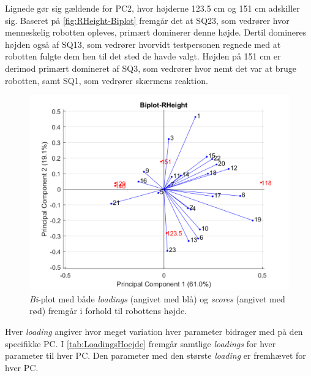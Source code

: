 Lignede gør sig gældende for PC2, hvor højderne 123.5 cm og 151 cm adskiller sig. Baseret på \autoref{fig:RHeight-Biplot} fremgår det at SQ23, som vedrører hvor menneskelig robotten opleves, primært dominerer denne højde. Dertil domineres højden også af SQ13, som vedrører hvorvidt testpersonen regnede med at robotten fulgte dem hen til det sted de havde valgt. Højden på 151 cm er derimod primært domineret af SQ3, som vedrører hvor nemt det var at bruge robotten, samt SQ1, som vedrører skærmens reaktion. 
%
\begin{figure}[H]
\centering
\includegraphics[width=\textwidth]{Figure/DatabehandlingSkalaer/PCAfigures/RHeight-Biplot.png}
\caption{\textit{Bi}-plot med både \textit{loadings} (angivet med blå) og \textit{scores} (angivet med rød) fremgår i forhold til robottens højde.}
\label{fig:RHeight-Biplot}
\end{figure}
\noindent
%
Hver \textit{loading} angiver hvor meget variation hver parameter bidrager med på den specifikke PC. I \autoref{tab:LoadingsHoejde} fremgår samtlige \textit{loadings} for hver parameter til hver PC. Den parameter med den største \textit{loading} er fremhævet for hver PC.  
%
